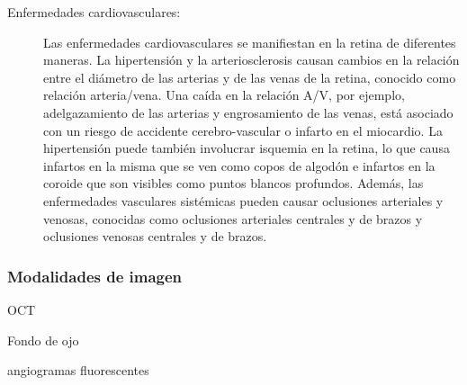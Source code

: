 \begin{description}
     \item[Enfermedades cardiovasculares:] Las enfermedades cardiovasculares se manifiestan en la retina de diferentes maneras. La hipertensión y la arteriosclerosis causan cambios en la relación entre el diámetro de las arterias y de las venas de la retina, conocido como relación arteria/vena. Una caída en la relación A/V, por ejemplo, adelgazamiento de las arterias y engrosamiento de las venas, está asociado con un riesgo de accidente cerebro-vascular o infarto en el miocardio. La hipertensión puede también involucrar isquemia en la retina, lo que causa infartos en la misma que se ven como copos de algodón e infartos en la coroide que son visibles como puntos blancos profundos. Además, las enfermedades vasculares sistémicas pueden causar oclusiones arteriales y venosas, conocidas como oclusiones arteriales centrales y de brazos y oclusiones venosas centrales y de brazos. \cite{fraz2012blood}
\end{description}
 
 
 
  
 

			\subsubsection{Modalidades de imagen}
			
			OCT
			
			Fondo de ojo
			 
			angiogramas fluorescentes
			


